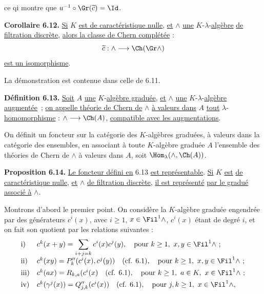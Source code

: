 
ce q\hphantom{u}i
montre que \(u^{-1}\circ\Gr(\widetilde c)=\Id\).

\textbf{Corollaire 6.12.} \uline{Si} \(K\) \uline{est de caractéristique nulle}, \uline{et} \(\mathord{\wedge}\) \uline{une} \(K\)-\(\lambda\)-\uline{algèbre} \uline{de filtration discrète}, \uline{alors la classe de Chern complétée} :
\[
  \widetilde c:\mathord{\wedge}\longrightarrow \Ch(\Gr\mathord{\wedge})
\]
\uline{est un isomorphisme}.

La démonstration est contenue dans celle de 6.11.

\textbf{Définition 6.13.} \uline{Soit} \(A\) \uline{une} \(K\)-\uline{algèbre graduée}, \uline{et} \(\mathord{\wedge}\) \uline{une} \(K\)-\(\lambda\)-\uline{algèbre} \uline{augmentée}~; \uline{on appelle théorie de Chern de} \(\mathord{\wedge}\) \uline{à valeurs dans} \(A\) \uline{tout} \(\lambda\)-\uline{homomorphisme} : \(\mathord{\wedge}\longrightarrow \Ch(A)\), \uline{compatible avec les augmentations}.

On définit un foncteur sur la catégorie des \(K\)-algèbres graduées, à valeurs dans la catégorie des ensembles, en associant à toute \(K\)-algèbre graduée \(A\) l'ensemble des théories de Chern de \(\mathord{\wedge}\) à valeurs dans \(A\), soit \(\Hom_\lambda(\mathord{\wedge},\Ch(A))\).

\textbf{Proposition 6.14.} \uline{Le foncteur défini en} 6.13 \uline{est représentable}. \uline{Si} \(K\) \uline{est} \uline{de caractéristique nulle}, \uline{et} \(\mathord{\wedge}\) \uline{de filtration discrète}, \uline{il est représenté} \uline{par le gradué associé à} \(\mathord{\wedge}\).

Montrons d'abord le premier point. On considère la \(K\)-algèbre graduée engendrée par des générateurs \(c^i(x)\), avec \(i\ge1\), \(x\in\Fil^1\mathord{\wedge}\), \(c^i(x)\) étant de degré \(i\), et on fait son quotient par les relations suivantes :
\[
\begin{array}{ll}
\text{i)}&
 c^k(x+y)=\displaystyle\sum_{i+j=k}c^i(x)c^j(y),
 \quad\text{pour } k\ge1,\ x,y\in\Fil^1\mathord{\wedge}\ ;\\[0.8em]
\text{ii)}&
 c^k(xy)=P''_k(c^i(x),c^j(y))
 \quad(\text{cf. }6.1),
 \quad\text{pour } k\ge1,\ x,y\in\Fil^1\mathord{\wedge}\ ;\\[0.4em]
\text{iii)}&
 c^k(ax)=R_{k,a}(c^i(x)
 \quad(\text{cf. }6.1),
 \quad\text{pour } k\ge1,\ a\in K,\ x\in\Fil^1\mathord{\wedge}\ ;\\[0.4em]
\text{iv)}&
 c^k(\gamma^j(x))=Q''_{j,k}(c^i(x))
 \quad(\text{cf. }6.1),
 \quad\text{pour } j,k\ge1,\ x\in\Fil^1\mathord{\wedge},
\end{array}
\]
